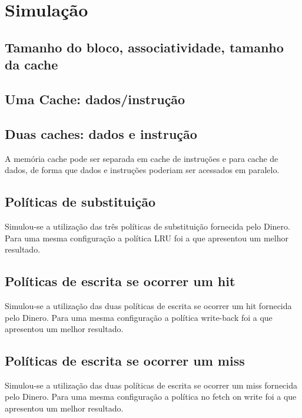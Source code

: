 \documentclass[12pt,a4paper]{article}
\begin{document}
\section{Simulação}

\subsection{Tamanho do bloco, associatividade, tamanho da cache}

\subsection{Uma Cache:  dados/instrução }

\subsection{Duas caches:  dados e  instrução}
A memória cache pode ser separada em cache de instruções e para cache de dados,
de forma que dados e instruções poderiam ser acessados em paralelo. 

\subsection{Políticas de substituição}
Simulou-se a utilização das três políticas de substituição fornecida
pelo Dinero.
Para uma mesma configuração a política LRU foi a que apresentou um
melhor resultado.
\subsection{Políticas de escrita se ocorrer um hit}
Simulou-se a utilização das duas políticas de escrita se ocorrer um
hit fornecida pelo Dinero.
Para uma mesma configuração a política write-back foi a que apresentou um
melhor resultado.

\subsection{Políticas de escrita se ocorrer um miss}
Simulou-se a utilização das duas políticas de escrita se ocorrer um
miss fornecida pelo Dinero.
Para uma mesma configuração a política no fetch on write foi a que apresentou um
melhor resultado.
\end{document}
